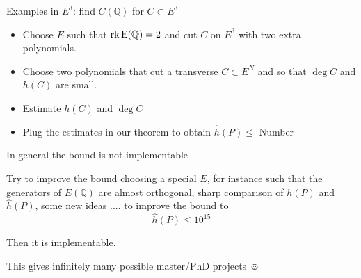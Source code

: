 \documentclass[12pt]{beamer}
\newcommand{\qe}{\mathbb{Q}}
\begin{document}
\begin{frame}{Examples in $E^3$: find $C(\mathbb{Q})$ for $C\subset E^3$} 
\begin{itemize}

\item Choose $E$ such that $\rm{rk}\, E(\mathbb{Q})=2$ and cut $C$ on $E^3$ with two extra polynomials.

\item Choose two polynomials that cut a transverse $C \subset E^N$ and so that $\deg C$ and $h(C)$ are small. 

\item Estimate $h(C)$ and $\deg C$

\item Plug the estimates in our theorem to obtain $\hat{h}(P)\le$ Number
\end{itemize}

\pause

\begin{alertblock}{In general the bound is not implementable }\end{alertblock}

\pause

Try to improve the bound choosing a special $E$, for instance such that
the generators of $E(\qe)$  are almost orthogonal, 
 sharp comparison of $h(P)$ and $\hat{h}(P)$, some new ideas .... to improve the bound to 
$$\hat{h}(P)\le 10^{15}$$

Then  it is implementable.

\pause
This gives infinitely many possible master/PhD projects {\Large$\smiley$}
\end{frame}
\end{document}
